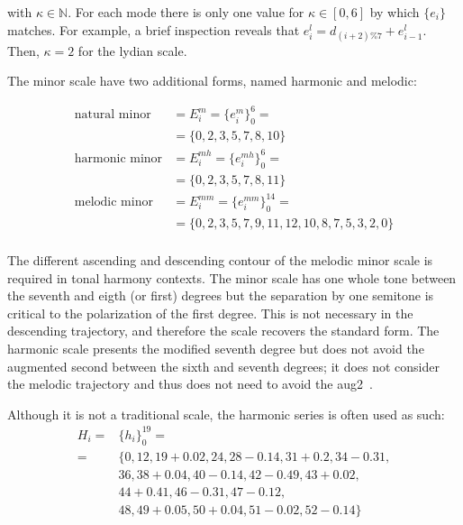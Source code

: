 \noindent with $\kappa \in \mathbb{N}$. For each mode there is only one value for $\kappa \in [0,6]$ by which $\{e_i\}$ matches. 
For example, a brief inspection reveals that
$e_i^{l}=d_{(i+2)\%7}+e_{i-1}^{l}$. Then, $\kappa=2$ for the lydian scale.

The minor scale have two additional forms, named harmonic and melodic:

\begin{equation}\label{eq:escalasMenores}
\begin{split}
\text{natural minor}&  = E_i^m = \{e_i^m\}_0^6 = \\
                                           &  = \{0,2,3,5,7,8,10\} \\
\text{harmonic minor}                      &  = E_i^{mh} = \{e_i^{mh}\}_0^6 = \\
                                           &  = \{0,2,3,5,7,8,11\} \\
\text{melodic minor}                       &  = E_i^{mm} = \{e_i^{mm}\}_0^{14} = \\
                                           &  = \{0,2,3,5,7,9,11,12,10,8,7,5,3,2,0\} \\
\end{split}
\end{equation}

The different ascending and descending contour of the melodic minor scale is required in tonal harmony contexts.
The minor scale has one whole tone between the seventh and eigth (or first) degrees but
the separation by one semitone is critical to the polarization of the first degree.
This is not necessary in the descending trajectory, and therefore the scale recovers the standard form.
The harmonic scale presents the modified seventh degree but does not avoid the augmented second between the sixth and seventh degrees; it does not consider the melodic trajectory and thus does not need to avoid the aug2~\cite{Harmonia}.

Although it is not a traditional scale, the harmonic series is often used as such:
\begin{equation}\label{eq:serieHarmonica}
\begin{split}
H_i = & \{h_i\}_0^{19}= \\
    =  & \{ 0,12,19+0.02,  24,28-0.14, 31+0.2, 34-0.31, \\
                     & 36, 38+0.04,40-0.14, 42-0.49, 43+0.02, \\
                     & 44+0.41, 46-0.31, 47-0.12, \\
                     & 48, 49+0.05, 50+0.04, 51-0.02, 52-0.14   \}
\end{split}
\end{equation}

